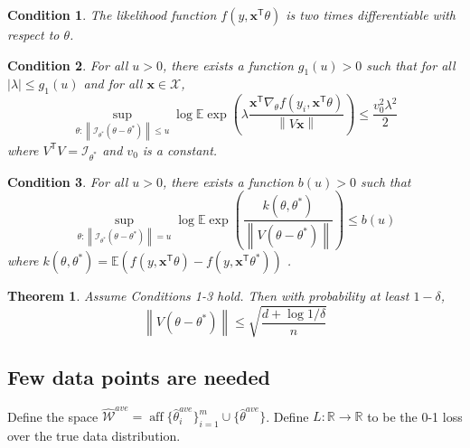 \documentclass[twoside]{article}
\newtheorem{theorem}{Theorem}
\newtheorem{assumption}{Condition}
\DeclareMathOperator*{\affspan}{aff}
\newcommand{\X}{\mathcal{X}}
\newcommand{\Wave}{{\mathcal{\hat W}^{ave}}}
\newcommand{\E}{\mathbb{E}}
\newcommand{\x}{\mathbf{x}}
\newcommand{\w}{\theta}
\newcommand{\wave}{\hat\w^{ave}}
\newcommand{\wstar}{{\w^{*}}}
\newcommand{\I}{\mathcal I}
\newcommand{\trans}[1]{\ensuremath{{#1}^{\mathsf{T}}}}
\newcommand{\ltwo}[1]{{\left\lVert {#1} \right\rVert}}
\begin{document}
\begin{assumption}
The likelihood function $f(y,\trans\x\w)$ is two times differentiable with respect to $\w$.
\end{assumption}
\begin{assumption}
For all $u>0$, there exists a function $g_1(u)>0$ such that for all $|\lambda| \le g_1(u)$
and for all $\x\in\X$,
\begin{equation}
\sup_{\w:\ltwo{\I_\wstar(\w-\wstar)} \le u}
\log\E\exp\left(\lambda\frac{\trans\x\nabla_\w f(y_i,\trans\x\w)}{\ltwo{V\x}}\right)
\le
\frac{v_0^2\lambda^2}{2}
\end{equation}
where $\trans V V = \I_\wstar$ and $v_0$ is a constant.
\end{assumption}
\begin{assumption}
For all $u>0$, there exists a function $b(u)>0$ such that
\begin{equation}
\sup_{\w:\ltwo{\I_\wstar(\w-\wstar)} = u}
\log\E\exp\left(\frac{k(\w,\wstar)}{\ltwo{V(\w-\wstar)}}\right)
\le
b(u)
\end{equation}
where
$
k(\w,\wstar) = \E\left(f(y,\trans\x\w) - f(y,\trans\x\wstar)\right)
$
.
\end{assumption}

\begin{theorem}
Assume Conditions 1-3 hold.
Then with probability at least $1-\delta$,
\begin{equation}
\ltwo{V(\w-\wstar)} \le \sqrt{\frac{d+\log{1/\delta}}{n}}
\end{equation}
\end{theorem}

\subsection{Few data points are needed}
\label{sec:vcdim}

Define the space
$\Wave=\affspan\{\wave_i\}_{i=1}^m\cup\{\wave\}$.
Define $L : \mathbb{R} \to \mathbb{R}$ to be the 0-1 loss over the true data distribution.
\end{document}
